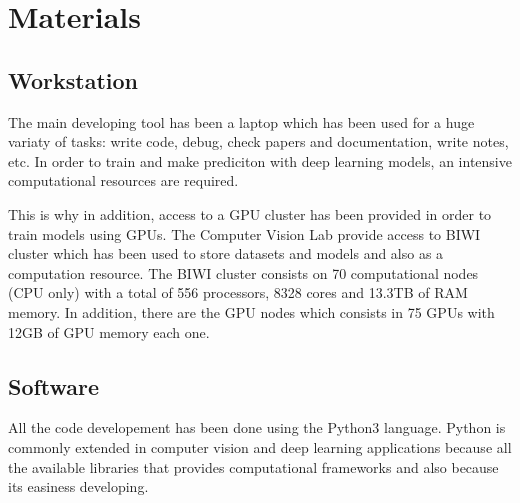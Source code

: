 
%
\newpage
\chapter{Materials}

\section{Workstation}

The main developing tool has been a laptop which has been used for a huge variaty of tasks: write code, debug, check papers and documentation, write notes, etc.
In order to train and make prediciton with deep learning models, an intensive computational resources are required.

This is why in addition, access to a GPU cluster has been provided in order to train models using GPUs.
The Computer Vision Lab provide access to BIWI cluster which has been used to store datasets and models and also as a computation resource. The BIWI cluster consists on 70 computational nodes (CPU only) with a total of 556 processors, 8328 cores and 13.3TB of RAM memory.
In addition, there are the GPU nodes which consists in 75 GPUs with 12GB of GPU memory each one.

\section{Software}

All the code developement has been done using the Python3 language.
Python is commonly extended in computer vision and deep learning applications because all the available libraries that provides computational frameworks and also because its easiness developing.

